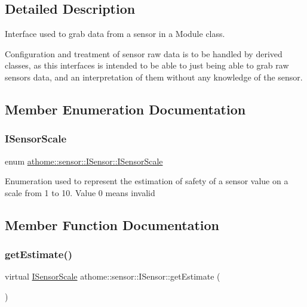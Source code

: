 \subsection{Detailed Description}
Interface used to grab data from a sensor in a Module class.

Configuration and treatment of sensor raw data is to be handled by derived classes, as this interfaces is intended to be able to just being able to grab raw sensors data, and an interpretation of them without any knowledge of the sensor. 

\subsection{Member Enumeration Documentation}
\mbox{\label{classathome_1_1sensor_1_1_i_sensor_aa70bc27a4c17c86caf96cca776541ddf}} 
\subsubsection{\texorpdfstring{I\+Sensor\+Scale}{ISensorScale}}
{\footnotesize\ttfamily enum \mbox{\hyperlink{classathome_1_1sensor_1_1_i_sensor_aa70bc27a4c17c86caf96cca776541ddf}{athome\+::sensor\+::\+I\+Sensor\+::\+I\+Sensor\+Scale}}}

Enumeration used to represent the estimation of safety of a sensor value on a scale from 1 to 10. Value 0 means invalid 

\subsection{Member Function Documentation}
\mbox{\label{classathome_1_1sensor_1_1_i_sensor_a95785b54ffe3a8f7e48c81b5732e3b9f}} 
\subsubsection{\texorpdfstring{get\+Estimate()}{getEstimate()}}
{\footnotesize\ttfamily virtual \mbox{\hyperlink{classathome_1_1sensor_1_1_i_sensor_aa70bc27a4c17c86caf96cca776541ddf}{I\+Sensor\+Scale}} athome\+::sensor\+::\+I\+Sensor\+::get\+Estimate (\begin{DoxyParamCaption}{ }\end{DoxyParamCaption})\hspace{0.3cm}{\ttfamily [pure virtual]}}

